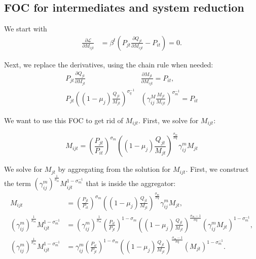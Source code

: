 \subsection{FOC for intermediates and system reduction}

We start with
\begin{align*}
\frac{\partial\mathcal{{L}}}{\partial M_{ijt}} & =\beta^{t}\left(P_{jt}\frac{\partial Q_{jt}}{\partial M_{ijt}}-P_{it}\right)=0.
\end{align*}

Next, we replace the derivatives, using the chain rule when needed:
\begin{align*}
P_{jt}\frac{\partial Q_{jt}}{\partial M_{jt}} & \frac{\partial M_{jt}}{\partial M_{ijt}}=P_{it} , \\
P_{jt}\left(\left(1-\mu_{j}\right)\frac{{Q_{jt}}}{M_{jt}}\right)^{\sigma_{q}^{-1}} & \left(\gamma_{ij}^{M}\frac{{M_{jt}}}{M_{ijt}}\right)^{\sigma_{m}^{-1}}=P_{it}
\end{align*}

We want to use this FOC to get rid of $M_{ijt}$. First, we solve
for $M_{ijt}$:

\[
M_{ijt}=\left(\frac{P_{jt}}{P_{it}}\right)^{\sigma_{m}}\left(\left(1-\mu_{j}\right)\frac{Q_{jt}}{M_{jt}}\right)^{\frac{{\sigma_{m}}}{\sigma q}}\gamma_{ij}^{m}M_{jt}
\]

We solve for $M_{jt}$ by aggregating from the solution for $M_{ijt}$.
First, we construct the term $\left(\gamma_{ij}^{m}\right)^{\frac{{1}}{\sigma_{m}}}M_{ijt}^{1-\sigma_{m}^{-1}}$
that is inside the aggregator:
\begin{align*}
M_{ijt} & =\left(\frac{P_{jt}}{P_{it}}\right)^{\sigma_{m}}\left(\left(1-\mu_{j}\right)\frac{Q_{jt}}{M_{jt}}\right)^{\frac{{\sigma_{m}}}{\sigma q}}\gamma_{ij}^{m}M_{jt},\\
\left(\gamma_{ij}^{m}\right)^{\frac{{1}}{\sigma_{m}}}M_{ijt}^{1-\sigma_{m}^{-1}} & =\left(\gamma_{ij}^{m}\right)^{\frac{{1}}{\sigma_{m}}}\left(\frac{P_{it}}{P_{jt}}\right)^{1-\sigma_{m}}\left(\left(1-\mu_{j}\right)\frac{{Q_{jt}}}{M_{jt}}\right)^{\frac{{\sigma_{m}-1}}{\sigma q}}\left(\gamma_{ij}^{m}M_{jt}\right)^{1-\sigma_{m}^{-1}},\\
\left(\gamma_{ij}^{m}\right)^{\frac{{1}}{\sigma_{m}}}M_{ijt}^{1-\sigma_{m}^{-1}} & =\gamma_{ij}^{m}\left(\frac{P_{it}}{P_{jt}}\right)^{1-\sigma_{m}}\left(\left(1-\mu_{j}\right)\frac{{Q_{jt}}}{M_{jt}}\right)^{\frac{{\sigma_{m}-1}}{\sigma q}}\left(M_{jt}\right)^{1-\sigma_{m}^{-1}}.
\end{align*}

